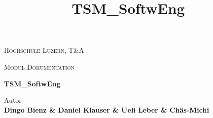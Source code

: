 
\begin{center}
\vspace{1.5cm}
{\scshape\LARGE Hochschule Luzern, T\&A \par}
{\scshape\Large Modul Dokumentation\par}
\vspace{2.0cm}
\title{TSM\_SoftwEng}
{\huge\bfseries TSM\_SoftwEng\par}

\vspace{16.0cm}

\end{center}

Autor \\
\textbf{Dingo Bienz \& Daniel Klauser \& Ueli Leber \& Chäs-Michi} \\


